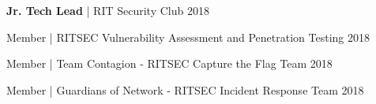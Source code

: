 



\begin{cvhonors}

  \cvhonor
    {} %
    {{\bf Jr. Tech Lead\space} | RIT Security Club} %
    {} %
    {2018} %

  \cvhonor
    {} %
    {Member \hspace{9 mm}| RITSEC Vulnerability Assessment and Penetration Testing} %
    {} %
    {2018} %
    
  \cvhonor
    {} %
    {Member \hspace{9 mm}| Team Contagion - RITSEC Capture the Flag Team} %
    {} %
    {2018} %
    
  \cvhonor
    {} %
    {Member \hspace{9 mm}| Guardians of Network - RITSEC Incident Response Team} %
    {} %
    {2018} %


\end{cvhonors}
